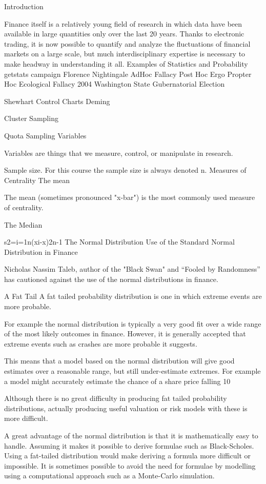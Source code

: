 


Introduction

Finance itself is a relatively young field of research in which data have been available in large quantities only over the last 20 years. Thanks to electronic trading, it is now possible to quantify and analyze the fluctuations of financial markets on a large scale, but much interdisciplinary expertise is necessary to make headway in understanding it all.
Examples of Statistics and Probability
getstats campaign
Florence Nightingale
AdHoc Fallacy
Post Hoc Ergo Propter Hoc
Ecological Fallacy
2004 Washington State Gubernatorial Election

Shewhart Control Charts
Deming

Cluster Sampling

Quota Sampling
Variables

Variables are things that we measure, control, or manipulate in research.


Sample size.
For this course the sample size is always denoted n.
Measures of Centrality
The mean 

The mean (sometimes pronounced "x-bar") is the most commonly used measure of centrality.

The Median


s2=i=1n(xi-x)2n-1
The Normal Distribution
Use of the Standard Normal Distribution in Finance

Nicholas Nassim Taleb, author of the "Black Swan" and “Fooled by Randomness” has cautioned against the use of the normal distributions in finance.

A Fat Tail
A fat tailed probability distribution is one in which extreme events are more probable.

For example the normal distribution is typically a very good fit over a wide range of the most likely outcomes in finance. However, it is generally accepted that extreme events such as crashes are more probable it suggests.

This means that a model based on the normal distribution will give good estimates over a reasonable range, but still under-estimate extremes. For example a model might accurately estimate the chance of a share price falling 10%

Although there is no great difficulty in producing fat tailed probability distributions, actually producing useful valuation or risk models with these is more difficult.

A great advantage of the normal distribution is that it is mathematically easy to handle. Assuming it makes it possible to derive formulae such as Black-Scholes. Using a fat-tailed distribution would make deriving a formula more difficult or impossible. It is sometimes possible to avoid the need for formulae by modelling using a computational approach such as a Monte-Carlo simulation.



